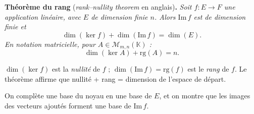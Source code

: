﻿%



\begin{tcolorbox}[thmbox]
  \textbf{Théorème du rang} (\emph{rank--nullity theorem} en anglais)\textbf{.}\enspace%
  \textit{Soit $f : E \to F$ une application linéaire, avec $E$ de dimension
  finie $n$. Alors $\mathrm{Im}\,f$ est de dimension finie et}
  \[
    \dim(\ker f) + \dim(\mathrm{Im}\,f) = \dim(E).
  \]
  \textit{En notation matricielle, pour $A \in \mathcal{M}_{m,n}(\mathbb{K})$ :}
  \[
    \dim(\ker A) + \mathrm{rg}(A) = n.
  \]
\end{tcolorbox}

$\dim(\ker f)$ est la \emph{nullité} de $f$ ;
$\dim(\mathrm{Im}\,f) = \mathrm{rg}(f)$ est le \emph{rang} de $f$.
Le théorème affirme que nullité + rang = dimension de l'espace de départ.

\decsep{}


\begin{ideepreuve}
On complète une base du noyau en une base de $E$, et on montre que les images
des vecteurs ajoutés forment une base de $\mathrm{Im}\,f$.
\end{ideepreuve}


